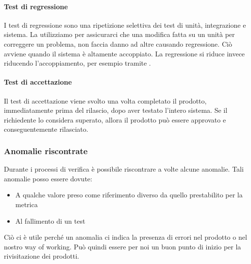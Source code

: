 			
			\paragraph{Test di regressione} \label{testregressione}
			I test di regressione sono una ripetizione selettiva dei test di unità, integrazione e sistema.
			La utilizziamo per assicurarci che una modifica fatta su un unità per correggere un problema, non faccia danno ad altre causando regressione.
			Ciò avviene quando il sistema è altamente accoppiato. 
			La regressione si riduce invece riducendo l'accoppiamento, per esempio tramite .
			
			\paragraph{Test di accettazione} \label{testaccettazione}
			Il test di accettazione viene svolto una volta completato il prodotto, immediatamente prima del rilascio, dopo aver testato l'intero sistema.
			Se il richiedente lo considera superato, allora il prodotto può essere approvato e conseguentemente rilasciato.
		
		
		\subsubsection{Anomalie riscontrate}\label{Anomalie}
		Durante i processi di verifica è possibile riscontrare a volte alcune anomalie.
		Tali anomalie posso essere dovute:
		\begin{itemize}
			\item A qualche valore preso come riferimento diverso da quello prestabilito per la metrica
			\item Al fallimento di un test
		\end{itemize}
		Ciò ci è utile perché un anomalia ci indica la presenza di errori nel prodotto o nel nostro way of working. Può quindi essere per noi un buon punto di inizio per la rivisitazione dei prodotti.
		
		